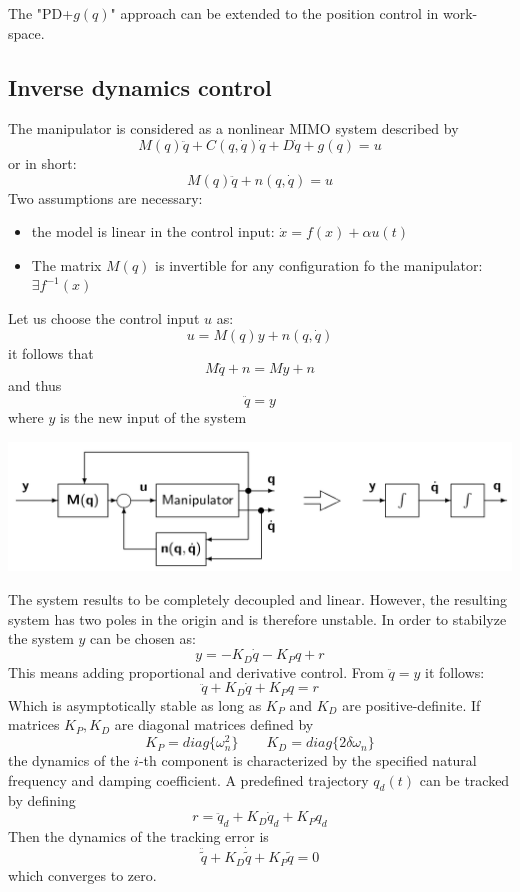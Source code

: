 \documentclass{book}
\begin{document}
The "PD+$g(q)$" approach can be extended to the position control in work-space.





\subsection{Inverse dynamics control}
The manipulator is considered as a nonlinear MIMO system described by 
\[
    M(q)\ddot{q}+C(q,\dot{q})\dot{q}+D\dot{q}+g(q)=u
\]
or in short:
\[
    M(q)\ddot{q}+n(q,\dot{q})=u
\]
Two assumptions are necessary:
\begin{itemize}
    \item the model is linear in the control input: $ \dot{x}=f(x)+\alpha u(t)$
    \item The matrix $M(q)$ is invertible for any configuration fo the manipulator: $ \exists f^{-1}(x)$
\end{itemize}
Let us choose the control input $u$ as:
\[
    u=M(q)y + n(q,\dot{q})
\]
it follows that
\[
    M\ddot{q}+n=My+n
\]
and thus
\[
    \ddot{q}=y
\]
where $y$ is the new input of the system

\includegraphics[width=\textwidth]{invkin}

The system results to be completely decoupled and linear. However, the resulting system has two poles in the origin and is therefore unstable. In order to stabilyze the system $y$ can be chosen as:
\[
    y= -K_D\dot{q}-K_Pq+r
\]
This means adding proportional and derivative control. From $\ddot{q}=y$ it follows:
\[
    \ddot{q}+K_D\dot{q}+K_Pq=r
\]
Which is asymptotically stable as long as $K_P$ and $K_D$ are positive-definite. If matrices $K_P,K_D$ are diagonal matrices defined by
\[
    K_P=diag\{\omega_n^2\} \qquad K_D=diag\{2\delta \omega_n\}
\]
the dynamics of the $i$-th component is characterized by the specified natural frequency and damping coefficient. A predefined trajectory $q_d(t)$ can be tracked by defining
\[
    r = \ddot{q}_d+K_D\dot{q}_d+K_Pq_d
\]
Then the dynamics of the tracking error is
\[
    \ddot{\tilde{q}} + K_D\dot{\tilde{q}} + K_P\tilde{q} = 0
\]
which converges to zero.
\end{document}
